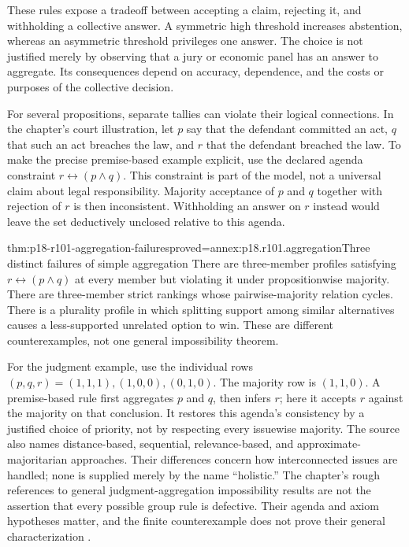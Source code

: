 These rules expose a tradeoff between accepting a claim, rejecting it,
and withholding a collective answer. A symmetric high threshold increases
abstention, whereas an asymmetric threshold privileges one answer. The
choice is not justified merely by observing that a jury or economic
panel has an answer to aggregate. Its consequences depend on accuracy,
dependence, and the costs or purposes of the collective decision.

For several propositions, separate tallies can violate their logical
connections. In the chapter's court illustration, let \(p\) say that
the defendant committed an act, \(q\) that such an act breaches the law,
and \(r\) that the defendant breached the law. To make the precise
premise-based example explicit, use the declared agenda constraint
\(r\leftrightarrow(p\land q)\). This constraint is part of the
model, not a universal claim about legal responsibility. Majority
acceptance of \(p\) and \(q\) together with rejection of \(r\) is
then inconsistent. Withholding an answer on \(r\) instead would leave
the set deductively unclosed relative to this agenda.

\begin{hbtheorem}{thm:p18-r101-aggregation-failures}{proved=annex:p18.r101.aggregation}{Three distinct failures of simple aggregation}
There are three-member profiles satisfying
\(r\leftrightarrow(p\land q)\) at every member but violating it under
propositionwise majority. There are three-member strict rankings whose
pairwise-majority relation cycles. There is a plurality profile in which
splitting support among similar alternatives causes a less-supported
unrelated option to win. These are different counterexamples, not one
general impossibility theorem.
\end{hbtheorem}

For the judgment example, use the individual rows
\((p,q,r)=(1,1,1),(1,0,0),(0,1,0)\). The majority row is
\((1,1,0)\). A premise-based rule first aggregates \(p\) and \(q\),
then infers \(r\); here it accepts \(r\) against the majority on
that conclusion. It restores this agenda's consistency by a justified
choice of priority, not by respecting every issuewise majority.
The source also names distance-based, sequential, relevance-based, and
approximate-majoritarian approaches. Their differences concern how
interconnected issues are handled; none is supplied merely by the name
``holistic.'' The chapter's rough references to general judgment-aggregation
impossibility results are not the assertion that every possible group
rule is defective. Their agenda and axiom hypotheses matter, and the
finite counterexample does not prove their general characterization
\parencite[pp.~581--582]{DietrichSpiekermann2021Social}.

